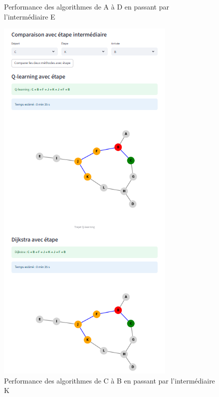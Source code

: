 \documentclass{article}
\begin{document}
\begin{figure}[htbp]
\begin{minipage}[b]{0.45\textwidth}
  \caption{Performance des algorithmes de A à D  en passant par l'intermédiaire E}
    \label{fig:Performance  des algorithmes de A à D  en passant par l'intermédiaire E}
  \end{minipage}
  \hfill
  \begin{minipage}[b]{0.45\textwidth}
    \centering
    \includegraphics[width=\textwidth]{image10.png}
 \caption{Performance  des algorithmes de C à B  en passant par l'intermédiaire K}
    \label{fig:Performance  des algorithmes de C à B  en passant par l'intermédiaire K}
  \end{minipage}
\end{figure}
\end{document}
